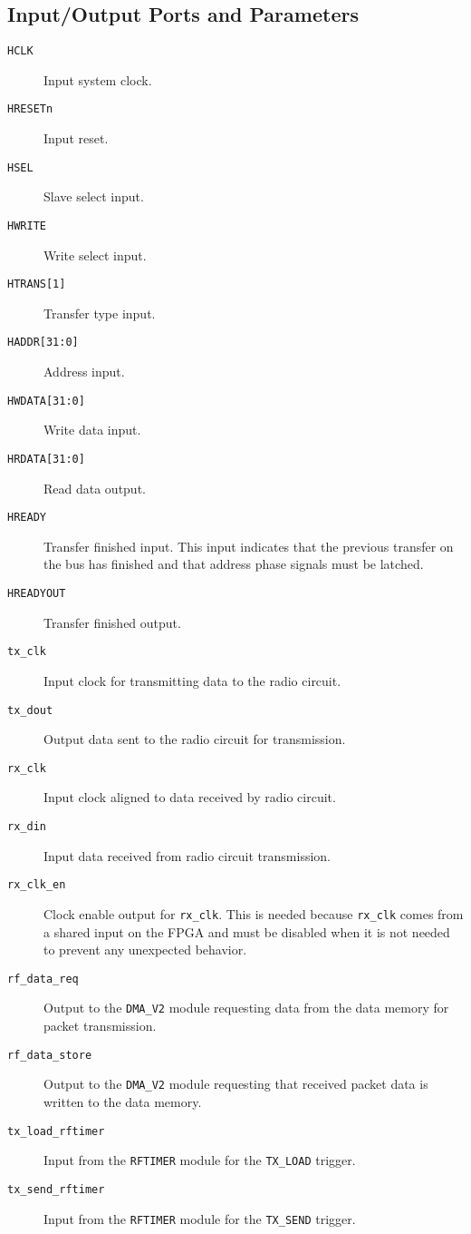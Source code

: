 \subsection{Input/Output Ports and Parameters}
\begin{description}
	\item[\texttt{HCLK}] Input system clock.
	\item[\texttt{HRESETn}] Input reset.
	\item[\texttt{HSEL}] Slave select input.
	\item[\texttt{HWRITE}] Write select input.
	\item[\texttt{HTRANS[1]}] Transfer type input.
	\item[\texttt{HADDR[31:0]}] Address input.
	\item[\texttt{HWDATA[31:0]}] Write data input.
	\item[\texttt{HRDATA[31:0]}] Read data output.
	\item[\texttt{HREADY}] Transfer finished input. This input indicates that the previous transfer on the bus has finished and that address phase signals must be latched.
	\item[\texttt{HREADYOUT}] Transfer finished output.
	\item[\texttt{tx\_clk}] Input clock for transmitting data to the radio circuit.
	\item[\texttt{tx\_dout}] Output data sent to the radio circuit for transmission.
	\item[\texttt{rx\_clk}] Input clock aligned to data received by radio circuit.
	\item[\texttt{rx\_din}] Input data received from radio circuit transmission.
	\item[\texttt{rx\_clk\_en}] Clock enable output for \texttt{rx\_clk}. This is needed because \texttt{rx\_clk} comes from a shared input on the FPGA and must be disabled when it is not needed to prevent any unexpected behavior.
	\item[\texttt{rf\_data\_req}] Output to the \texttt{DMA\_V2} module requesting data from the data memory for packet transmission.
	\item[\texttt{rf\_data\_store}] Output to the \texttt{DMA\_V2} module requesting that received packet data is written to the data memory.
	\item[\texttt{tx\_load\_rftimer}] Input from the \texttt{RFTIMER} module for the \texttt{TX\_LOAD} trigger.
	\item[\texttt{tx\_send\_rftimer}] Input from the \texttt{RFTIMER} module for the \texttt{TX\_SEND} trigger.

\end{description}
